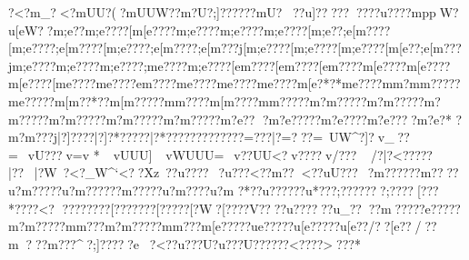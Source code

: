 {{{{{{{{{{{{{{{{{{{{{{{{{{{{{{{{{{{{{{{{{{{{{{{{{{{{{{{{{{{{{{{{{{{{{{{{{{{{{{{{{{{{{{{{{{{{{{{{{{{{{{{{{{{{{{{{{{{{{{{{{{{{{{{{{{{{{{{{{{{{{{{{{{{{{{{{{{{{{{{{{{{{{{{{{{{{{{{{{{{{{{{{{{{{{{{{{{{{{{{{{{{{{{{{{{{{{{{{{{{{{{{{{{{{{{{{{{{{{{{{{{{{{{{{{{{{{{{{{{{{{{{{{{{{{{{{{{{{{{{{{{{{{{{{{{{{{{{{{{{{{{{{{{{{{{{{{{{{{{{{{{{{{{{{{{{{{{{{{{{{{{{{{{{{{{{{{{{{{{{{{{{{{{{{{{{{{{{{{{{{{{{{{{{{{{{{{{{{{{{{{{{{{{{{{{{{{{{{{{{{{{{{{{{{{{{{{{{{{{{{{{{{{{{{{{{{{{{{{{{{{{{{{{{{{{{{{{{{{{{{{{{{{{{{{{{{{{{{{{{{{{{{{{{{{{{{{{{{{{{{{{{{{{{{{{{{{{{{{{{{{{{{{{{{{{{{{{{{{{{{{{{{{{{{{{{{{{{{{{{{{{{{{{{{{{{{{{{{{{{{{{{{{{{{{{{{{{{{{{{{{{{{{{{{{{{{{{{{{{{{{{{{{{{{{{{{{{{{{{{{{{{{{{{{{{{{{{{{{{{{{{{{{{{{{{{{{{{{{{{{{{{{{{{{{{{{{{{{{{{{{{{{{{{{{{{{{{{{{{{{{{{{{{{{{{{{{{{{{{{{{{{{{{{{{{{{{{{{{{{{{{{{{{{{{{{{{{{{{{{{{{{{{{{{{{{{{{{{{{{{{{{{{{{{{{{{{{{{{{{{{{{{{{{{{{{{{{{{{{{{{{{{{{{{{{{{{{{{{{{{{{{{{{{{{{{{{{{{{{{{{{{{{{{{{{{{{{{{{{{{{{{{{{{{{{{{{{{{{{{{{{{{{{{{{{{{{{{{{{{{{{{{{{?<?{m_? <?{mUU?(?{mUUW??{m?U{ ?;]??????{mU???u]????}?????u ????}{mppW?u[eW??{m;e??{m;e????[m[e????{m;e????{m;e????{m;e????[m;e??;e[m????[m;e????;e[m????[m;e????;e[m????;e[m???j[m;e????[m;e????[m;e????[m[e??;e[m???j{m;e????{m;e????{m;e????;m{e????{m;e????[e{m????[e{m????[e{m????{m[e????{m[e????{m[e????[m{e????{m{e????{e{m????{m{e????{m{e????{m{e????{m[e?*?*{m{e????{m{m    ?m{m?????m{e?????m[m??*??m[m?????m{m????m[m??? ?m{m?????m?m?????m?m?????m?m?????m?m?????m?m?????m?m?????m?e??
?m?e?????m?e ????m?e????m?e?*
 ?m?m???j|?]????|?]?*?????|?*?????????????=??? |?=??? \?=~UW^?]?v_??=~vU???v=v  
*~vUUU]~vWUUU=~v??UU<?v????\?v/???\?~ 
/?|?<?????|?\??|?\?W~?\?<?_W^`<??Xz~\??u????~?u???<??m??<??uU???~?m?????}?m????u?m?????u?m?????}?m?????u?m ????u?m 
?*?}?u?????}?u*???;??}?????;????[???*???{?<?
??{?\?????{?[???????[????{?[?W?[????V????u??????u_????m?? ???e?????m?m?????m{m???m?m?????m{m???m[e?????u{e?????u[e?????u[e??/??[e??/??m???m???^?;]?????{e?<??u???U\??u???U\???????<????^^~??}?*
}}}}}}}}}}}}}}}}}}}}}}}}}}}}}}}}}}}}}}}}}}}}}}}}}}}}}}}}}}}}}}}}}}}}}}}}}}}}}}}}}}}}}}}}}}}}}}}}}}}}}}}}}}}}}}}}}}}}}}}}}}}}}}}}}}}}}}}}}}}}}}}}}}}}}}}}}}}}}}}}}}}}}}}}}}}}}}}}}}}}}}}}}}}}}}}}}}}}}}}}}}}}}}}}}}}}}}}}}}}}}}}}}}}}}}}}}}}}}}}}}}}}}}}}}}}}}}}}}}}}}}}}}}}}}}}}}}}}}}}}}}}}}}}}}}}}}}}}}}}}}}}}}}}}}}}}}}}}}}}}}}}}}}}}}}}}}}}}}}}}}}}}}}}}}}}}}}}}}}}}}}}}}}}}}}}}}}}}}}}}}}}}}}}}}}}}}}}}}}}}}}}}}}}}}}}}}}}}}}}}}}}}}}}}}}}}}}}}}}}}}}}}}}}}}}}}}}}}}}}}}}}}}}}}}}}}}}}}}}}}}}}}}}}}}}}}}}}}}}}}}}}}}}}}}}}}}}}}}}}}}}}}}}}}}}}}}}}}}}}}}}}}}}}}}}}}}}}}}}}}}}}}}}}}}}}}}}}}}}}}}}}}}}}}}}}}}}}}}}}}}}}}}}}}}}}}}}}}}}}}}}}}}}}}}}}}}}}}}}}}}}}}}}}}}}}}}}}}}}}}}}}}}}}}}}}}}}}}}}}}}}}}}}}}}}}}}}}}}}}}}}}}}}}}}}}}}}}}}}}}}}}}}}}}}}}}}}}}}}}}}}}}}}}}}}}}}}}}}}}}}}}}}}}}}}}}}}}}}}}}}}}}}}}}}}}}}}}}}}}}}}}}}}}}}}}}}}}}}}}}}}}}}}}}}}}}}}}}}}}}}}}}}}}}}}}}}}}}}}}}}}}}}}}}}}}}}}}}}}}}}}}}}}}}}}}}}}}}}}}}}}}}}}}}}}}}}}}}}}}}}}}}}}}}}}}}}}}}}}}}}}}}}}}}}}}}}}}}}}}}}}}}}}}}}}}}}}}}}}}}}}}}}}}}}}}}}}}}}}}}}}}}}}}}}
